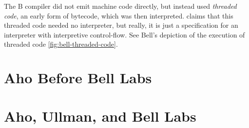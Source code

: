 The B compiler did not emit machine code directly, but instead used
\textit{threaded code}\cite{bell_threaded_code_1973}, an early form of \gls{bytecode},
which was then interpreted.
\citeauthor{bell_threaded_code_1973} claims that this threaded code needed no interpreter,
but really, it is just a specification for an interpreter with interpretive control-flow.
See Bell's depiction of the execution of threaded code \ref{fig:bell-threaded-code}.

\section{Aho Before Bell Labs}

\section{Aho, Ullman, and Bell Labs}

